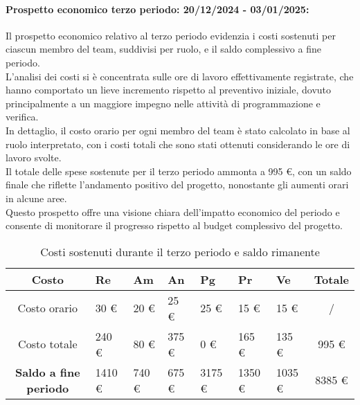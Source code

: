 \paragraph{Prospetto economico terzo periodo: 20/12/2024 - 03/01/2025: }
Il prospetto economico relativo al terzo periodo evidenzia i costi sostenuti per ciascun membro del team, suddivisi per ruolo, e il saldo complessivo a fine periodo.\\
L'analisi dei costi si è concentrata sulle ore di lavoro effettivamente registrate, che hanno comportato un lieve incremento rispetto al preventivo iniziale, dovuto principalmente a un maggiore impegno nelle attività di programmazione e verifica. \\
In dettaglio, il costo orario per ogni membro del team è stato calcolato in base al ruolo interpretato, con i costi totali che sono stati ottenuti considerando le ore di lavoro svolte. \\
Il totale delle spese sostenute per il terzo periodo ammonta a 995 \euro, con un saldo finale che riflette l'andamento positivo del progetto, nonostante gli aumenti orari in alcune aree.\\
Questo prospetto offre una visione chiara dell'impatto economico del periodo e consente di monitorare il progresso rispetto al budget complessivo del progetto.

\begin{table}[!h]
    \centering
    \renewcommand{\arraystretch}{1.5}
    \begin{tabularx}{\textwidth}{|c|X|X|X|X|X|X|c|}\hline
    \rowcolor[HTML]{FFD700} 
    \textbf{Costo} & \textbf{Re} & \textbf{Am} & \textbf{An} & \textbf{Pg} & \textbf{Pr} & \textbf{Ve} & \textbf{Totale} \\ \hline
    Costo orario & 30 \euro & 20 \euro & 25 \euro & 25 \euro & 15 \euro & 15 \euro & /  \\ \hline
    Costo totale & 240 \euro & 80 \euro & 375 \euro & 0 \euro & 165 \euro & 135 \euro & 995 \euro \\ \hline
    \rowcolor[HTML]{FFD700} 
    \textbf{Saldo a fine periodo}  & 1410 \euro & 740 \euro  & 675 \euro & 3175 \euro & 1350 \euro & 1035 \euro & 8385 \euro \\ \hline
    \end{tabularx}
    \caption{Costi sostenuti durante il terzo periodo e saldo rimanente}
\end{table}

